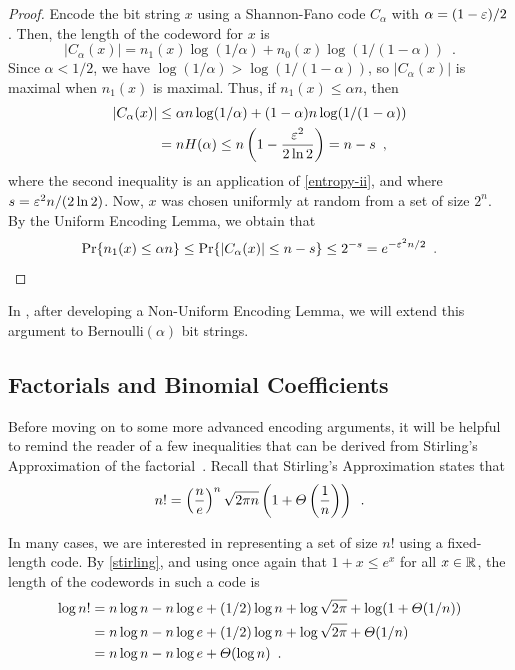 \documentclass{patmorin}
\begin{document}
\begin{proof}
  Encode the bit string $x$ using a Shannon-Fano code $C_\alpha$ with
  $\alpha=(1-\varepsilon)/2$. 
  Then, the length of the codeword for $x$ is
  \[
    |C_\alpha(x)| = n_1(x)\log(1/\alpha) + n_0(x)\log (1/(1-\alpha))
    \enspace .
  \]
  Since $\alpha < 1/2$, we have $\log(1/\alpha) > \log(1/(1-\alpha))$, so
  $|C_\alpha(x)|$ is maximal when $n_1(x)$ is maximal. 
    Thus, if $n_1(x) \le \alpha n$,
  then
  \begin{align*}
    |C_\alpha(x)| & \le \alpha n\log(1/\alpha) + (1-\alpha)n\log(1/(1-\alpha))\\
                  & = n H(\alpha) \le n\left(1-\frac{\varepsilon^2}{2\ln 2}\right) = n - s \enspace ,
  \end{align*}
  where the second inequality is an application of \eqref{entropy-ii},
  and where $s = \varepsilon^2 n/(2 \ln 2)$.  Now, $x$ was chosen uniformly at
  random from a set of size $2^n$. By the Uniform Encoding Lemma, we
  obtain that
  \[
    \Pr\{n_1(x) \leq \alpha n\} \le \Pr\{|C_\alpha(x)| \le n - s\} \le 2^{-s} = e^{-\varepsilon^2n/2} \enspace . \qedhere
  \]
\end{proof}
In , after developing a Non-Uniform Encoding Lemma,
we will extend this argument to $\mathrm{Bernoulli}(\alpha)$ bit
strings. 

\subsection{Factorials and Binomial Coefficients}

Before moving on to some more advanced encoding arguments, it will be
helpful to remind the reader of a few inequalities that can be derived
from Stirling's Approximation of the factorial~\cite{robbins:stirling}.  
Recall that Stirling's
Approximation states that
\begin{equation}
  n! = \left(\frac{n}{e}\right)^n\sqrt{2\pi n}\left(1+\varTheta\left(\frac{1}{n}\right)\right) \enspace .
  \eqlabel{stirling}
\end{equation}

In many cases, we are interested in representing a set of size $n!$
using a fixed-length code.  By \eqref{stirling}, and using once again that
$1+x \leq e^x$ for all $x \in \mathbb{R}$, the length of the codewords in such a code
is
\begin{align}
  \log n!
  & = n\log n - n\log e + (1/2)\log n + \log \sqrt{2 \pi} + \log(1+\varTheta(1/n)) \notag \\
  & = n\log n - n\log e + (1/2)\log n + \log \sqrt{2 \pi} + \varTheta(1/n) \notag \\
  & = n\log n - n\log e + \varTheta(\log n) \eqlabel{stirling-loose}
    \enspace .
\end{align}
\end{document}
